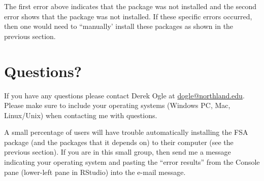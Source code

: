 \documentclass{article}\usepackage[]{graphicx}\usepackage[]{color}
\begin{document}
The first error above indicates that the  package was not installed and the second error shows that the  package was not installed.  If these specific errors occurred, then one would need to ``manually' install these packages as shown in the previous section.

\section{Questions?}
If you have any questions please contact Derek Ogle at \href{mailto:dogle@northland.edu}{dogle@northland.edu}.  Please make sure to include your operating systems (Windows PC, Mac, Linux/Unix) when contacting me with questions.

A small percentage of users will have trouble automatically installing the FSA package (and the packages that it depends on) to their computer (see the previous section).  If you are in this small group, then send me a message indicating your operating system and pasting the ``error results'' from the Console pane (lower-left pane in RStudio) into the e-mail message.
\end{document}
